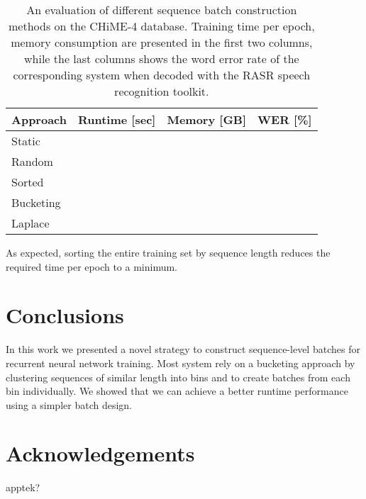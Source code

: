 \documentclass{article}
\begin{document}
	\begin{table}[tbp]
		\centering
		\caption{An evaluation of different sequence batch construction methods on the CHiME-4 database. Training time per epoch, memory consumption are presented in the first two columns, while the last columns shows the word error rate of the corresponding system
		when decoded with the RASR speech recognition toolkit.}
		\label{tab:chime:batch}
		\begin{tabular}{lrrr}
			\hline
			Approach                & Runtime [sec] & Memory [GB] & WER [\%] \\
			\hline
			Static					&				&			  &			 \\
			Random 					&				&			  & 		 \\
			Sorted					& 				&			  &			 \\
			\hline
			Bucketing				&				&			  &			 \\
			Laplace					&				&			  &			 \\
			\hline
		\end{tabular}
	\end{table}

  As expected, sorting the entire training set by sequence length reduces the required time 
  per epoch to a minimum. 
      
  \section{Conclusions}
    In this work we presented a novel strategy to construct sequence-level batches for recurrent 
    neural network training. Most system rely on a bucketing approach by clustering sequences of similar length into bins and to create batches from each bin individually. We showed that we can achieve a better runtime performance using a simpler batch design.

   \section{Acknowledgements}
 
   apptek?
   
   \ninept
   
   
\end{document}
